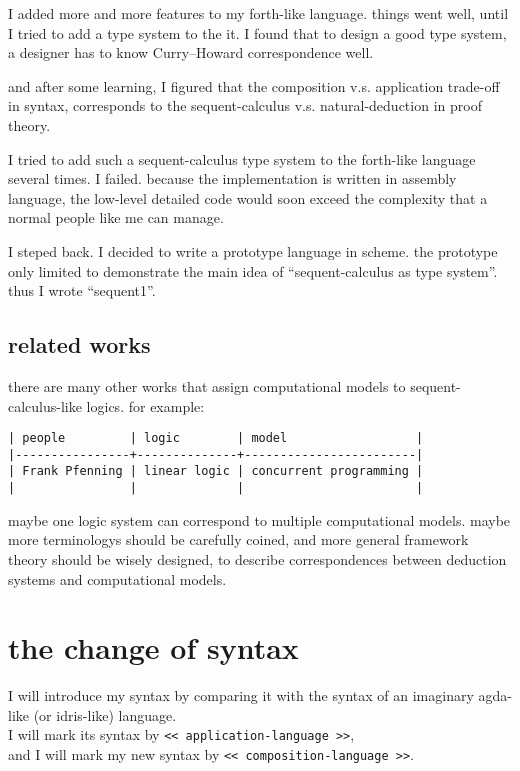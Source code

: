 \documentclass{sigplanconf}
\begin{document}
I added more and more features to my forth-like language.
things went well, until I tried to add a type system to the it.
I found that
to design a good type system,
a designer has to know Curry--Howard correspondence well.

and after some learning,
I figured that
the composition v.s. application trade-off in syntax,
corresponds to
the sequent-calculus v.s. natural-deduction in proof theory.

I tried to add such a sequent-calculus type system
to the forth-like language several times.
I failed.
because the implementation is written in assembly language,
the low-level detailed code would soon exceed the complexity
that a normal people like me can manage.

I steped back.
I decided to write a prototype language in scheme.
the prototype only limited to demonstrate the main idea of ``sequent-calculus as type system''.
thus I wrote ``sequent1''.

\subsection{related works}

there are many other works
that assign computational models to sequent-calculus-like logics.
for example:

{\scriptsize\begin{verbatim}
| people         | logic        | model                  |
|----------------+--------------+------------------------|
| Frank Pfenning | linear logic | concurrent programming |
|                |              |                        |
\end{verbatim}}

maybe one logic system can correspond to multiple computational models.
maybe more terminologys should be carefully coined,
and more general framework theory should be wisely designed,
to describe correspondences between deduction systems and computational models.

\section{the change of syntax}

I will introduce my syntax by comparing it with
the syntax of an imaginary agda-like (or idris-like) language. \\
I will mark its syntax by {\scriptsize\verb|<< application-language >>|}, \\
and I will mark my new syntax by {\scriptsize\verb|<< composition-language >>|}.
\end{document}

